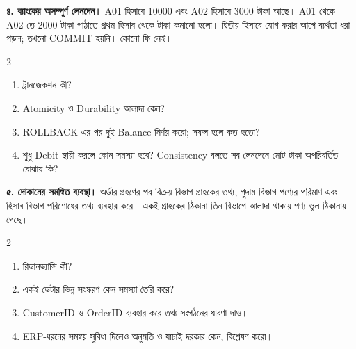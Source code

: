 \textbf{৪. ব্যাংকের অসম্পূর্ণ লেনদেন।} A01 হিসাবে 10000 এবং A02 হিসাবে 3000 টাকা আছে। A01 থেকে A02-তে 2000 টাকা পাঠাতে প্রথম হিসাব থেকে টাকা কমানো হলো। দ্বিতীয় হিসাবে যোগ করার আগে ব্যর্থতা ধরা পড়ল; তখনো COMMIT হয়নি। কোনো ফি নেই।
\begin{multicols}{2}
\begin{enumerate}
\item[ক.] ট্রানজেকশন কী?
\item[খ.] Atomicity ও Durability আলাদা কেন?
\item[গ.] ROLLBACK-এর পর দুই Balance নির্ণয় করো; সফল হলে কত হতো?
\item[ঘ.] শুধু Debit স্থায়ী করলে কোন সমস্যা হবে? Consistency বলতে সব লেনদেনে মোট টাকা অপরিবর্তিত বোঝায় কি?
\end{enumerate}
\end{multicols}

\textbf{৫. দোকানের সমন্বিত ব্যবস্থা।} অর্ডার গ্রহণের পর বিক্রয় বিভাগ গ্রাহকের তথ্য, গুদাম বিভাগ পণ্যের পরিমাণ এবং হিসাব বিভাগ পরিশোধের তথ্য ব্যবহার করে। একই গ্রাহকের ঠিকানা তিন বিভাগে আলাদা থাকায় পণ্য ভুল ঠিকানায় গেছে।
\begin{multicols}{2}
\begin{enumerate}
\item[ক.] \begin{minipage}[t]{\linewidth}রিডানড্যান্সি কী?
\end{minipage}
\item[খ.] \begin{minipage}[t]{\linewidth}একই ডেটার ভিন্ন সংস্করণ কেন সমস্যা তৈরি করে?
\end{minipage}
\item[গ.] \begin{minipage}[t]{\linewidth}CustomerID ও OrderID ব্যবহার করে তথ্য সংগঠনের ধারণা দাও।
\end{minipage}
\item[ঘ.] \begin{minipage}[t]{\linewidth}ERP-ধরনের সমন্বয় সুবিধা দিলেও অনুমতি ও যাচাই দরকার কেন, বিশ্লেষণ করো।
\end{minipage}
\end{enumerate}
\end{multicols}

